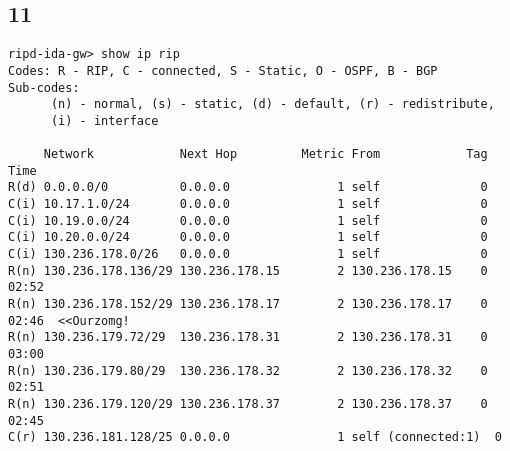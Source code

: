 \subsection{11}
\begin{verbatim}
ripd-ida-gw> show ip rip
Codes: R - RIP, C - connected, S - Static, O - OSPF, B - BGP
Sub-codes:
      (n) - normal, (s) - static, (d) - default, (r) - redistribute,
      (i) - interface

     Network            Next Hop         Metric From            Tag Time
R(d) 0.0.0.0/0          0.0.0.0               1 self              0
C(i) 10.17.1.0/24       0.0.0.0               1 self              0
C(i) 10.19.0.0/24       0.0.0.0               1 self              0
C(i) 10.20.0.0/24       0.0.0.0               1 self              0
C(i) 130.236.178.0/26   0.0.0.0               1 self              0
R(n) 130.236.178.136/29 130.236.178.15        2 130.236.178.15    0 02:52
R(n) 130.236.178.152/29 130.236.178.17        2 130.236.178.17    0 02:46  <<Ourzomg!
R(n) 130.236.179.72/29  130.236.178.31        2 130.236.178.31    0 03:00
R(n) 130.236.179.80/29  130.236.178.32        2 130.236.178.32    0 02:51
R(n) 130.236.179.120/29 130.236.178.37        2 130.236.178.37    0 02:45
C(r) 130.236.181.128/25 0.0.0.0               1 self (connected:1)  0
\end{verbatim}




